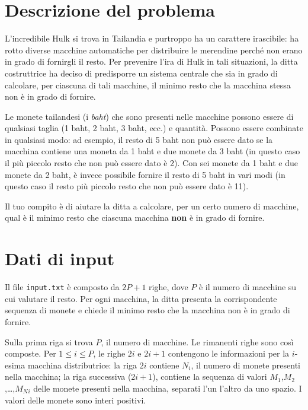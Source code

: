 \documentclass[a4paper,11pt]{article}
\begin{document}
\vspace{0.5cm}



\section*{Descrizione del problema}
  
L'incredibile Hulk si trova in Tailandia e purtroppo ha un carattere
irascibile: ha rotto diverse macchine automatiche per distribuire le
merendine perché non erano in grado di fornirgli il resto.  Per
prevenire l'ira di Hulk in tali situazioni, la ditta costruttrice ha
deciso di predisporre un sistema centrale che sia in grado di
calcolare, per ciascuna di tali macchine, il minimo resto che la
macchina stessa non è in grado di fornire.

Le monete tailandesi (i \emph{baht}) che sono presenti nelle macchine
possono essere di qualsiasi taglia (1 baht, 2 baht, 3 baht, ecc.)  e
quantità. Possono essere combinate in qualsiasi modo: ad
esempio, il resto di 5 baht non può essere dato se la macchina
contiene una moneta da 1 baht e due monete da 3 baht (in questo caso
il più piccolo resto che non può essere dato è
2). Con sei monete da 1 baht e due monete da 2 baht, è invece
possibile fornire il resto di 5 baht in vari modi (in questo caso il
resto più piccolo resto che non può essere dato è
11).

Il tuo compito è di aiutare la ditta a calcolare, per un certo
numero di macchine, qual è il minimo resto che ciascuna
macchina \textbf{non} è in grado di fornire.


\section*{Dati di input}
  Il file \texttt{input.txt} è composto da $2P+1$
  righe, dove $P$ è il numero di macchine su cui
  valutare il resto. Per ogni macchina, la ditta presenta la corrispondente
  sequenza di monete e chiede il minimo  resto che la macchina non
  è in grado di fornire.

  Sulla prima riga si trova $P$, il numero di macchine. Le
  rimanenti righe sono così composte. Per $1 ≤ i ≤
  P$, le righe $2i$ e $2i+1$ contengono le
  informazioni per la $i$-esima macchina distributrice: la
  riga $2i$ contiene $N_{i}$, il numero di
  monete presenti nella macchina; la riga successiva
  ($2i+1$), contiene la sequenza di
  valori $M_{1}$,$M_{2}$,…,$M_{N}$$_{i}$
  delle monete presenti nella macchina, separati l'un l'altro da uno
  spazio.  I valori delle monete sono interi positivi.
\end{document}
